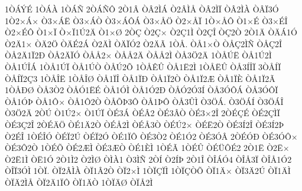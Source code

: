 {1^^d2^^c1^^dd^^c9
1^^d2^^c1^^c0
1^^d2^^c1^^d1
2^^d2^^c1^^d1^^d4
2^^d21^^c2
^^d2^^c22^^cc^^c1
^^d22^^c2^^cc^^c5
^^d2^^c22^^cc^^cf
^^d2^^c22^^cc^^c0
^^d2^^c2^^cf3^^d3
1^^d22^^d7^^c1^^d7
^^d23^^d7^^c1^^cb
^^d23^^d7^^c1^^d2
^^d23^^d7^^c1^^d4^^c1
^^d23^^d7^^c5^^d6
^^d22^^d7^^c5^^cf
1^^d2^^d7^^c5^^d4
^^d21^^d7^^c9
^^d23^^d7^^c9^^ce
^^d22^^d7^^c9^^d4
^^d21^^d7^^cf
^^d2^^d7^^cf1^^da2^^c4
^^d21^^d7^^d8
2^^d2^^c7
^^d22^^c7^^d7
^^d22^^c71^^cc
^^d22^^c7^^ce
^^d2^^c72^^d2
2^^d21^^c4
^^d2^^c4^^c11^^d3
^^d22^^c41^^d7
^^d2^^c42^^d6
^^d2^^c4^^c92^^c1
^^d22^^c4^^cc
^^d2^^c4^^cf^^d32
^^d22^^c4^^c3
1^^d2^^c5.
^^d2^^c51^^d7^^d2
^^d2^^c5^^c72^^cc^^d1
^^d2^^c5^^c72^^ce
^^d2^^c52^^c41^^cf2^^d0
^^d2^^c52^^c4^^cf^^d3
^^d2^^c5^^c52^^d7
^^d2^^c5^^c52^^c4
^^d2^^c5^^c52^^cc
^^d2^^c53^^d62^^c4
1^^d2^^c5^^da^^cb
^^d2^^c51^^da2^^cc
^^d2^^c51^^da^^ce^^c1
1^^d2^^c51^^da^^cf
^^d2^^c51^^da^^d2
^^d2^^c5^^da2^^d5
1^^d2^^c5^^ca^^db
^^d2^^c51^^cb2^^cc
1^^d2^^c5^^cb^^db
^^d2^^c53^^cd^^ce^^cf
3^^d2^^c5^^cd^^cf
^^d2^^c5^^cd^^cf2^^c73
1^^d2^^c5^^ce^^cb
1^^d2^^c5^^ce^^d8
^^d2^^c51^^cf^^ce
^^d2^^c51^^cf^^d0
^^d2^^c51^^cf2^^d2
^^d2^^c51^^cf2^^c6
^^d2^^c51^^cf^^c8
^^d2^^c51^^cf2^^c3
1^^d2^^c5^^d0^^d8
^^d2^^c53^^d22
^^d2^^c5^^d31^^cb^^c9
^^d2^^c51^^d3^^cc
^^d2^^c51^^d32^^d0
^^d2^^c5^^d32^^d33^^cd
^^d2^^c53^^d3^^d4^^c1
^^d2^^c53^^d3^^d4^^cf
^^d2^^c51^^d3^^de
^^d2^^c51^^d4^^d7
^^d2^^c51^^d42^^d2
^^d2^^c5^^d5^^de3^^d4
^^d2^^c51^^de^^d4
^^d2^^c53^^db^^cc
^^d23^^d6^^c1.
^^d23^^d6^^c1^^cd
^^d23^^d6^^c1^^ce
^^d23^^d62^^c4
2^^d2^^da
^^d21^^da2^^d7
^^d21^^da^^cf
^^d2^^c93^^c1
^^d2^^c9^^c22
^^d2^^c93^^c2^^d2
^^d2^^c93^^d72^^ce
2^^d2^^c9^^c7^^c9
^^d2^^c92^^c7^^cc^^cf
^^d2^^c93^^c72^^ce
2^^d2^^c9^^c4^^d6
^^d2^^c91^^c42^^d2
^^d2^^c9^^c52^^cc
^^d2^^c9^^c53^^d2
^^d2^^c9^^da2^^d7
^^d2^^c9^^cb2^^d2
^^d2^^c93^^cd2^^ce
^^d2^^c93^^cd2^^de
^^d22^^c9^^ce
1^^d2^^c9^^ce^^d3
^^d2^^c9^^cf2^^da
^^d2^^c9^^cf2^^d3
^^d2^^c91^^cf^^d4
^^d2^^c93^^d22
^^d2^^c91^^d32
^^d2^^c93^^d3^^c2
2^^d2^^c9^^d3^^d0
^^d2^^c93^^d3^^d4^^d7
^^d2^^c93^^d42^^d2
1^^d2^^c9^^d5
^^d2^^c92^^c6^^cc
^^d2^^c93^^c6^^d2
^^d2^^c91^^c8^^cc
1^^d2^^c9^^c3
1^^d2^^c9^^db
^^d2^^c9^^dc^^d4^^c92
2^^d21^^cb
^^d22^^cb^^d7
^^d22^^cb1^^cc
^^d2^^cb1^^d3
2^^d21^^cc2
^^d22^^cc^^d8
^^d2^^cc^^c01
^^d23^^cc^^d1
2^^d2^^cd
^^d22^^cd^^de
2^^d21^^ce
^^d2^^ce^^c1^^d34
^^d2^^ce^^c53^^cf
^^d2^^ce^^c51^^d32
^^d2^^ce^^cf3^^d3^^cc
1^^d2^^cf.
^^d2^^cf2^^c2^^cc^^c0
^^d2^^cf1^^c22^^d2
^^d2^^cf2^^d7^^cc
1^^d2^^cf^^c7^^cf^^cc
1^^d2^^cf^^c7^^d2^^d5
^^d2^^cf1^^c4^^d7
^^d2^^cf3^^c42^^da
^^d2^^cf1^^c4^^cc
^^d2^^cf^^c42^^cc^^c5
^^d2^^cf2^^c41^^cf^^d4
^^d2^^cf1^^c4^^d2
1^^d2^^cf^^c4^^d8
^^d2^^cf^^c52^^cc
}
